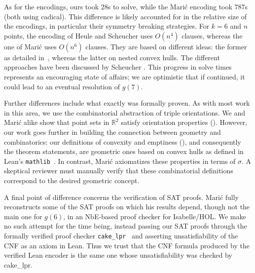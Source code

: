 As for the encodings,
ours took 28s to solve,
while the Marić encoding took 787s (both using \textsf{cadical}).
This difference is likely accounted for in the relative size of the encodings,
in particular their symmetry breaking strategies.
For $k=6$ and $n$ points,
the encoding of Heule and Scheucher uses $O(n^4)$ clauses,
whereas the one of Marić uses $O(n^6)$ clauses.
They are based on different ideas:
the former as detailed in~,
whereas the latter on nested convex hulls.
The different approaches have been discussed by Scheucher \cite{scheucherTwoDisjoint5holes2020}.
This progress in solve times
represents an encouraging state of affairs;
we are optimistic that if continued,
it could lead to an eventual resolution of $g(7)$.

Further differences include what exactly was formally proven.
As with most work in this area,
we use the combinatorial abstraction of triple orientations.
We and Marić alike show that point sets in $\mathbb R^2$
satisfy orientation properties ().
However, our work goes further in building the connection
between geometry and combinatorics:
our definitions of convexity and emptiness (),
and consequently the theorem statements,
are geometric ones based on convex hulls
as defined in Lean's \texttt{mathlib}~\cite{The_mathlib_Community_2020}.
In contrast, Marić axiomatizes these properties in terms of $\sigma$.
A skeptical reviewer must manually verify that these combinatorial definitions
correspond to the desired geometric concept.

A final point of difference concerns the verification of SAT proofs.
Marić fully reconstructs some of the SAT proofs on which his results depend,
though not the main one for $g(6)$,
in an NbE-based proof checker for Isabelle/HOL.
We make no such attempt for the time being,
instead passing our SAT proofs through the
formally verified proof checker \texttt{cake\_lpr}~\cite{tanVerifiedPropagationRedundancy2023}
and asserting unsatisfiability of the CNF as an axiom in Lean.
Thus we trust that the CNF formula produced by the verified Lean encoder
is the same one whose unsatisfiability was checked by \textsf{cake\_lpr}.
